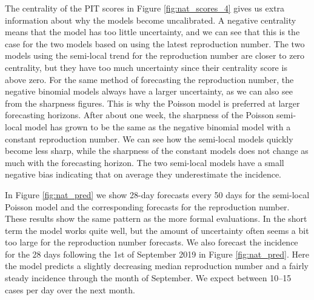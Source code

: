 \documentclass[12pt]{article}
\begin{document}
The centrality of the PIT scores in Figure \ref{fig:nat_scores_4} gives us extra information about why the models become uncalibrated. A negative centrality means that the model has too little uncertainty, and we can see that this is the case for the two models based on using the latest reproduction number. The two models using the semi-local trend for the reproduction number are closer to zero centrality, but they have too much uncertainty since their centrality score is above zero. For the same method of forecasting the reproduction number, the negative binomial models always have a larger uncertainty, as we can also see from the sharpness figures. This is why the Poisson model is preferred at larger forecasting horizons. After about one week, the sharpness of the Poisson semi-local model has grown to be the same as the negative binomial model with a constant reproduction number. We can see how the semi-local models quickly become less sharp, while the sharpness of the constant models does not change as much with the forecasting horizon. The two semi-local models have a small negative bias indicating that on average they underestimate the incidence.

In Figure \ref{fig:nat_pred} we show 28-day forecasts every 50 days for the semi-local Poisson model and the corresponding forecasts for the reproduction number. These results show the same pattern as the more formal evaluations. In the short term the model works quite well, but the amount of uncertainty often seems a bit too large for the reproduction number forecasts. We also forecast the incidence for the 28 days following the 1st of September 2019 in Figure \ref{fig:nat_pred}. Here the model predicts a slightly decreasing median reproduction number and a fairly steady incidence through the month of September. We expect between 10--15 cases per day over the next month. 
\end{document}
